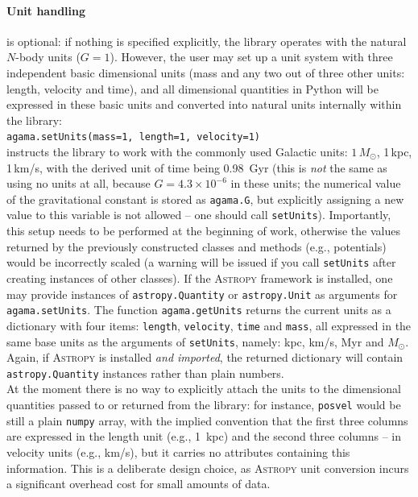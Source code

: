\documentclass[12pt]{article}
\let\oldparagraph\paragraph
\renewcommand{\paragraph}[1]{\vspace{-2mm}\oldparagraph{#1}}
\begin{document}
\paragraph{Unit handling} is optional: if nothing is specified explicitly, the library operates with the natural $N$-body units ($G=1$). However, the user may set up a unit system with three independent basic dimensional units (mass and any two out of three other units: length, velocity and time), and all dimensional quantities in Python will be expressed in these basic units and converted into natural units internally within the library:\\[1mm]
\texttt{agama.setUnits(mass=1, length=1, velocity=1)}\\[1mm]
instructs the library to work with the commonly used Galactic units: $1\,M_\odot$, 1\,kpc, 1\,km/s, with the derived unit of time being 0.98~Gyr (this is \textit{not} the same as using no units at all, because $G=4.3\times10^{-6}$ in these units; the numerical value of the gravitational constant is stored as \texttt{agama.G}, but explicitly assigning a new value to this variable is not allowed -- one should call \texttt{setUnits}). Importantly, this setup needs to be performed at the beginning of work, otherwise the values returned by the previously constructed classes and methods (e.g., potentials) would be incorrectly scaled (a warning will be issued if you call \texttt{setUnits} after creating instances of other classes). If the \textsc{Astropy} framework \cite{Astropy} is installed, one may provide instances of \texttt{astropy.Quantity} or \texttt{astropy.Unit} as arguments for \texttt{agama.setUnits}. The function \texttt{agama.getUnits} returns the current units as a dictionary with four items: \texttt{length}, \texttt{velocity}, \texttt{time} and \texttt{mass}, all expressed in the same base units as the arguments of \texttt{setUnits}, namely: kpc, km/s, Myr and $M_\odot$. Again, if \textsc{Astropy} is installed \textit{and imported}, the returned dictionary will contain \texttt{astropy.Quantity} instances rather than plain numbers.\\
At the moment there is no way to explicitly attach the units to the dimensional quantities passed to or returned from the library: for instance, \texttt{posvel} would be still a plain \texttt{numpy} array, with the implied convention that the first three columns are expressed in the length unit (e.g., 1~kpc) and the second three columns -- in velocity units (e.g., km/s), but it carries no attributes containing this information. This is a deliberate design choice, as \textsc{Astropy} unit conversion incurs a significant overhead cost for small amounts of data.
\end{document}

